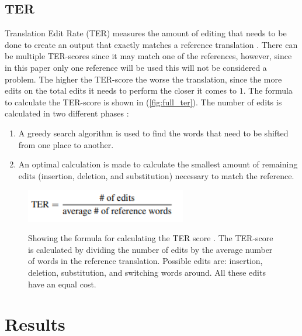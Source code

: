 \subsection{TER}

Translation Edit Rate (TER) measures the amount of editing that needs to be done to create an output that exactly matches a reference translation \cite{TERsnover2006}. There can be multiple TER-scores since it may match one of the references, however, since in this paper only one reference will be used this will not be considered a problem. The higher the TER-score the worse the translation, since the more edits on the total edits it needs to perform the closer it comes to $1$. The formula to calculate the TER-score is shown in (\autoref{fig:full_ter}). The number of edits is calculated in two different phases \cite{shapira2002edit}:
\begin{enumerate}
    \item A greedy search algorithm is used to find the words that need to be shifted from one place to another.
    \item An optimal calculation is made to calculate the smallest amount of remaining edits (insertion, deletion, and substitution) necessary to match the reference.
\end{enumerate}



\begin{figure}[h]
 \caption{Showing the formula for calculating the TER score \cite{TERsnover2006}. The TER-score is calculated by dividing the number of edits by the average number of words in the reference translation. Possible edits are: insertion, deletion, substitution, and switching words around. All these edits have an equal cost.}
 \centering 
 \includegraphics[width=7cm]{Bachelor CSAI thesis template/images/ter_formula.PNG}
 \label{fig:full_ter}
\end{figure}




\section{Results}


